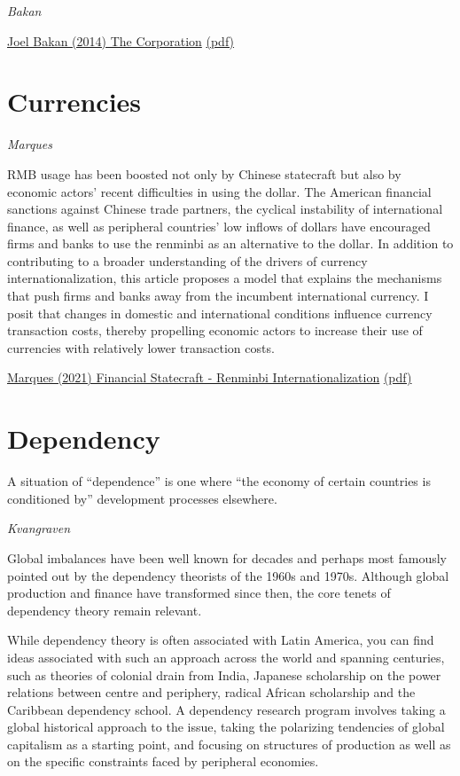\documentclass[
]{book}
\begin{document}
\emph{Bakan}

\href{https://archive.org/details/pdfy-4lBa31vI_yWrRdVi}{Joel Bakan (2014) The Corporation}
\href{pdf/Joel_Bakan_2014_The_Corporation.pdf}{(pdf)}

\hypertarget{currencies}{%
\chapter{Currencies}\label{currencies}}

\emph{Marques}

RMB usage has been boosted not only by Chinese
statecraft but also by economic actors' recent difficulties in using the dollar. The
American financial sanctions against Chinese trade partners, the cyclical
instability of international finance, as well as peripheral countries' low inflows of
dollars have encouraged firms and banks to use the renminbi as an alternative to
the dollar. In addition to contributing to a broader understanding of the drivers of
currency internationalization, this article proposes a model that explains the
mechanisms that push firms and banks away from the incumbent international
currency. I posit that changes in domestic and international conditions influence
currency transaction costs, thereby propelling economic actors to increase their
use of currencies with relatively lower transaction costs.

\href{https://refubium.fu-berlin.de/handle/fub188/30516}{Marques (2021) Financial Statecraft - Renminbi Internationalization}
\href{pdf/Marques_2021_Renminbi.pdf}{(pdf)}

\hypertarget{dependency}{%
\chapter{Dependency}\label{dependency}}

A situation of ``dependence'' is one where ``the economy of certain countries is conditioned by'' development processes elsewhere.

\emph{Kvangraven}

Global imbalances have been well known for decades and perhaps most famously pointed out by the dependency theorists of the 1960s and 1970s. Although global production and finance have transformed since then, the core tenets of dependency theory remain relevant.

While dependency theory is often associated with Latin America, you can find ideas associated with such an approach across the world and spanning centuries, such as theories of colonial drain from India, Japanese scholarship on the power relations between centre and periphery, radical African scholarship and the Caribbean dependency school. A dependency research program involves taking a global historical approach to the issue, taking the polarizing tendencies of global capitalism as a starting point, and focusing on structures of production as well as on the specific constraints faced by peripheral economies.
\end{document}
